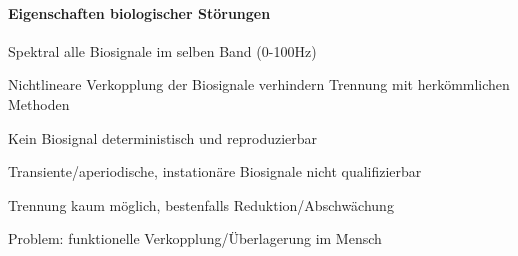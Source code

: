 \documentclass[a4paper]{article}
\begin{document}
\begin{multicols}{3}
  \paragraph{Eigenschaften biologischer Störungen}\label{eigenschaften-biologischer-störungen}

  \begin{itemize*}
    \item Spektral alle Biosignale im selben Band (0-100Hz)
    \item Nichtlineare Verkopplung der Biosignale verhindern Trennung mit herkömmlichen Methoden
    \item Kein Biosignal deterministisch und reproduzierbar
    \item Transiente/aperiodische, instationäre Biosignale nicht qualifizierbar
    \item Trennung kaum möglich, bestenfalls Reduktion/Abschwächung
    \item Problem: funktionelle Verkopplung/Überlagerung im Mensch
  \end{itemize*}




\end{multicols}
\end{document}
